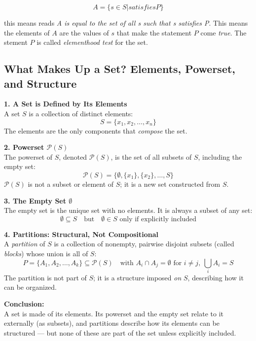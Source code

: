 \documentclass[10pt]{article}
\theoremstyle{plain}
\theoremstyle{definition}
\begin{document}
	 $$A = \{s \in S | satisfies P\}$$
	 
	 this means reads \textit{A is equal to the set of all s such that s satisfies P}. This means the elements of $A$ are the values of $s$ that make the statement $P$ come \textit{true}. The stement $P$ is called \textit{elementhood test} for the set.
	 
	 
	\subsection*{What Makes Up a Set? Elements, Powerset, and Structure}
	
	\textbf{1. A Set is Defined by Its Elements} \\
	A set \( S \) is a collection of distinct elements:
	\[
	S = \{x_1, x_2, \ldots, x_n\}
	\]
	The elements are the only components that \emph{compose} the set.
	
	\vspace{1em}
	\textbf{2. Powerset \( \mathcal{P}(S) \)} \\
	The powerset of \( S \), denoted \( \mathcal{P}(S) \), is the set of all subsets of \( S \), including the empty set:
	\[
	\mathcal{P}(S) = \{ \emptyset, \{x_1\}, \{x_2\}, \ldots, S \}
	\]
	\(\mathcal{P}(S)\) is not a subset or element of \( S \); it is a new set constructed from \( S \).
	
	\vspace{1em}
	\textbf{3. The Empty Set \( \emptyset \)} \\
	The empty set is the unique set with no elements. It is always a subset of any set:
	\[
	\emptyset \subseteq S \quad \text{but} \quad \emptyset \in S \text{ only if explicitly included}
	\]
	
	\vspace{1em}
	\textbf{4. Partitions: Structural, Not Compositional} \\
	A \emph{partition} of \( S \) is a collection of nonempty, pairwise disjoint subsets (called \emph{blocks}) whose union is all of \( S \):
	\[
	P = \{A_1, A_2, \ldots, A_k\} \subseteq \mathcal{P}(S)
	\quad \text{with } A_i \cap A_j = \emptyset \text{ for } i \neq j,\ 
	\bigcup_i A_i = S
	\]
	The partition is not part of \( S \); it is a structure imposed \emph{on} \( S \), describing how it can be organized.
	
	\vspace{1em}
	\textbf{Conclusion:} \\
	A set is made of its elements. Its powerset and the empty set relate to it externally (as subsets), and partitions describe how its elements can be structured — but none of these are part of the set unless explicitly included.
	
\end{document}
